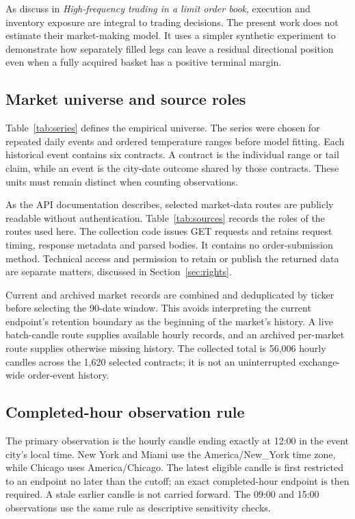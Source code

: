 As  discuss in \textit{High-frequency trading in a limit order book}, execution and inventory exposure are integral to trading decisions. The present work does not estimate their market-making model. It uses a simpler synthetic experiment to demonstrate how separately filled legs can leave a residual directional position even when a fully acquired basket has a positive terminal margin.

\label{sec:data}
\subsection{Market universe and source roles}
Table~\ref{tab:series} defines the empirical universe. The series were chosen for repeated daily events and ordered temperature ranges before model fitting. Each historical event contains six contracts. A contract is the individual range or tail claim, while an event is the city-date outcome shared by those contracts. These units must remain distinct when counting observations.


As the  API documentation describes, selected market-data routes are publicly readable without authentication. Table~\ref{tab:sources} records the roles of the routes used here. The collection code issues GET requests and retains request timing, response metadata and parsed bodies. It contains no order-submission method. Technical access and permission to retain or publish the returned data are separate matters, discussed in Section~\ref{sec:rights}.


Current and archived market records are combined and deduplicated by ticker before selecting the 90-date window. This avoids interpreting the current endpoint's retention boundary as the beginning of the market's history. A live batch-candle route supplies available hourly records, and an archived per-market route supplies otherwise missing history. The collected total is 56,006 hourly candles across the 1,620 selected contracts; it is not an uninterrupted exchange-wide order-event history.

\subsection{Completed-hour observation rule}
The primary observation is the hourly candle ending exactly at 12:00 in the event city's local time. New York and Miami use the America/New\_York time zone, while Chicago uses America/Chicago. The latest eligible candle is first restricted to an endpoint no later than the cutoff; an exact completed-hour endpoint is then required. A stale earlier candle is not carried forward. The 09:00 and 15:00 observations use the same rule as descriptive sensitivity checks.

